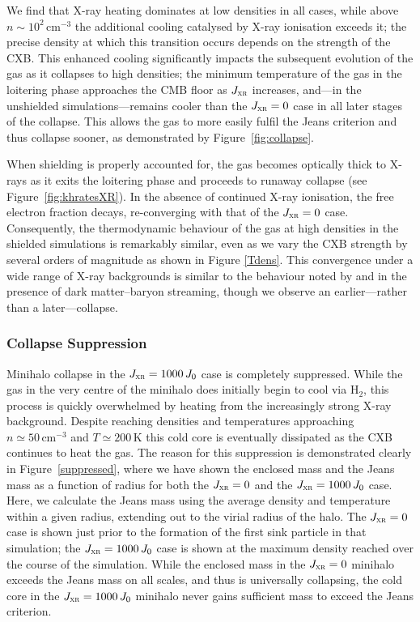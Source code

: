 \documentclass{thesis}
\newcommand{\kelvin}{\ensuremath{\,\mathrm{K}}\xspace}
\newcommand{\cc}{\ensuremath{\,\mathrm{cm}^{-3}}\xspace}
\newcommand{\htwo}{\ensuremath{\mathrm{H}_2}\xspace}
\newcommand{\jxr}{\ensuremath{J_{\textsc{xr}}}\xspace}
\newcommand{\RefFig}[1]{\mbox{Figure~\ref{#1}}}
\begin{document}
We find that X-ray heating dominates at low densities in all cases, while above $n\sim10^2\cc$ the additional cooling catalysed by X-ray ionisation exceeds it; the precise density at which this transition occurs depends on the strength of the CXB.  This enhanced cooling significantly impacts the subsequent evolution of the gas as it collapses to high densities; the minimum temperature of the gas in the loitering phase approaches the CMB floor as $\jxr$ increases, and---in the unshielded simulations---remains cooler than the $\jxr=0$ case in all later stages of the collapse. This allows the gas to more easily fulfil the Jeans criterion and thus collapse sooner, as demonstrated by \RefFig{fig:collapse}.

When shielding is properly accounted for, the gas becomes optically thick to X-rays as it exits the loitering phase and proceeds to runaway collapse (see \RefFig{fig:khratesXR}).  In the absence of continued X-ray ionisation, the free electron fraction decays, re-converging with that of the $\jxr=0$ case.  Consequently, the thermodynamic behaviour of the gas at high densities in the shielded simulations is remarkably similar, even as we vary the CXB strength by several orders of magnitude as shown in Figure \ref{Tdens}. This convergence under a wide range of X-ray backgrounds is similar to the behaviour noted by \citet{StacyBrommLoeb2011a} and \citet{Greifetal2011b} in the presence of dark matter--baryon streaming, though we observe an earlier---rather than a later---collapse.

\subsubsection{Collapse Suppression}
 \label{suppression}
Minihalo collapse in the $\jxr = 1000\,J_0$ case is completely suppressed.  While the gas in the very centre of the minihalo does initially begin to cool via \htwo, this process is quickly overwhelmed by heating from the increasingly strong X-ray background.  Despite reaching densities and temperatures approaching $n \simeq 50\cc$ and $T \simeq 200\kelvin$ this cold core is eventually dissipated as the CXB continues to heat the gas. 
The reason for this suppression is demonstrated clearly in \RefFig{suppressed}, where we have shown the enclosed mass and the Jeans mass as a function of radius for both the $\jxr = 0$ and the $\jxr = 1000\,J_0$ case. Here, we calculate the Jeans mass using the average density and temperature within a given radius, extending out to the virial radius of the halo.  The $\jxr = 0$ case is shown just prior to the formation of the first sink particle in that simulation; the $\jxr = 1000\,J_0$ case is shown at the maximum density reached over the course of the simulation.  While the enclosed mass in the $\jxr = 0$ minihalo exceeds the Jeans mass on all scales, and thus is universally collapsing, the cold core in the $\jxr = 1000\,J_0$ minihalo never gains sufficient mass to exceed the Jeans criterion.
\end{document}
